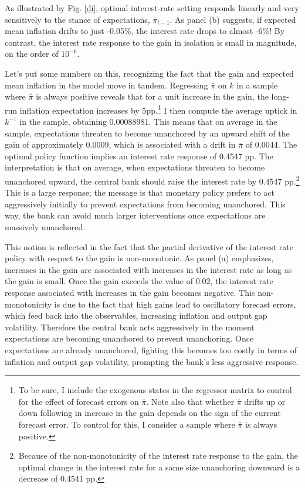 \documentclass[11pt]{article}
\renewcommand{\[}{\begin{equation}}
\renewcommand{\]}{\end{equation}}
\def\ppMoveFFR{0.4547 }
\begin{document}
As illustrated by Fig. \ref{di}, optimal interest-rate setting responds linearly and very sensitively to the stance of expectations, $\bar{\pi}_{t-1}$. As panel (b) suggests, if expected mean inflation drifts to just -0.05\%, the interest rate drops to almost -6\%! By contrast, the interest rate response to the gain in isolation is small in magnitude, on the order of $10^{-6}$. 

Let's put some numbers on this, recognizing the fact that the gain and expected mean inflation in the model move in tandem. Regressing $\bar{\pi}$ on $k$ in a sample where $\bar{\pi}$ is always positive reveals that for a unit increase in the gain, the long-run inflation expectation increases by 5pp.\footnote{To be sure, I include the exogenous states in the regressor matrix to control for the effect of forecast errors on $\bar{\pi}$. Note also that whether $\bar{\pi}$ drifts up or down following in increase in the gain depends on the sign of the current forecast error. To control for this, I consider a sample where $\bar{\pi}$ is always positive.} I then compute the average uptick in $k^{-1}$ in the sample, obtaining 0.00088981. This means that on average in the sample, expectations threaten to become unanchored by an upward shift of the gain of approximately 0.0009, which is associated with a drift in $\bar{\pi}$ of 0.0044. The optimal policy function implies an interest rate response of \ppMoveFFR pp. The interpretation is that on average, when expectations threaten to become unanchored upward, the central bank should raise the interest rate by \ppMoveFFR pp.\footnote{Because of the non-monotonicity of the interest rate response to the gain, the optimal change in the interest rate for a same size unanchoring downward is a decrease of 0.4541 pp.} This is a large response; the message is that monetary policy prefers to act aggressively initially to prevent expectations from becoming unanchored. This way, the bank can avoid much larger interventions once expectations are massively unanchored. 

This notion is reflected in the fact that the partial derivative of the interest rate policy with respect to the gain is non-monotonic. As panel (a) emphasizes, increases in the gain are associated with increases in the interest rate as long as the gain is small. Once the gain exceeds the value of 0.02, the interest rate response associated with increases in the gain becomes negative. This non-monotonicity is due to the fact that high gains lead to oscillatory forecast errors, which feed back into the observables, increasing inflation and output gap volatility. Therefore the central bank acts aggressively in the moment expectations are becoming unanchored to prevent unanchoring. Once expectations are already unanchored, fighting this becomes too costly in terms of inflation and output gap volatility, prompting the bank's less aggressive response. 
\end{document}
